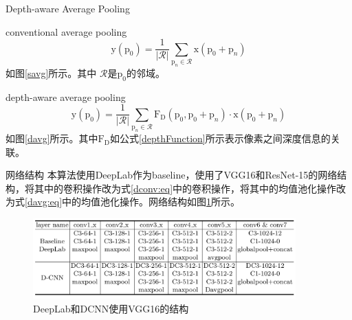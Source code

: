 \documentclass{beamer}
\begin{document}
\begin{frame}[<+->]{Depth-aware Average Pooling}

\begin{block}{conventional average pooling}
	\begin{equation}
	\mathrm{y}(\mathrm{p}_0)=\frac{1}{|\mathcal{R}|}\sum_{\mathrm{p}_n\in \mathcal{R}} \mathrm{x}(\mathrm{p}_0+\mathrm{p}_n)
	\end{equation}
	如图\ref{savg}所示。其中 $\mathcal{R}$是$\mathrm{p}_0$的邻域。
\end{block}


\begin{block}{depth-aware average pooling}
	\begin{equation}
	\label{davg:eq}
	\mathrm{y}(\mathrm{p}_0)=\frac{1}{|\mathcal{R}|}\sum_{\mathrm{p}_n\in \mathcal{R}} \mathrm{F_D}(\mathrm{p}_0,\mathrm{p}_0+\mathrm{p}_n)\cdot\mathrm{x}(\mathrm{p}_0+\mathrm{p}_n)
	\end{equation}
	如图\ref{davg}所示。其中$\mathrm{F_D}$如公式\ref{depthFunction}所示表示像素之间深度信息的关联。
\end{block}

\end{frame}

\begin{frame}{网络结构}
本算法使用DeepLab作为baseline，使用了VGG16和ResNet-15的网络结构，将其中的卷积操作改为式\ref{dconv:eq}中的卷积操作，将其中的均值池化操作改为式\ref{davg:eq}中的均值池化操作。网络结构如图\ref{arch}所示。

\begin{figure}[h]
	\centering
	\includegraphics[width=0.9\textwidth]{images/arch.png}
	\caption{\label{arch}DeepLab和DCNN使用VGG16的结构}
\end{figure}
\end{frame}
\end{document}
